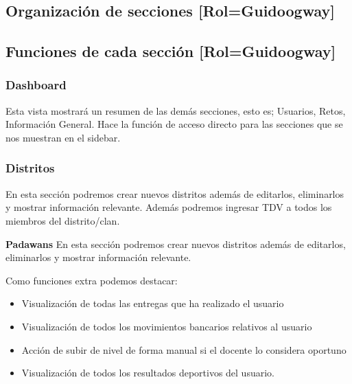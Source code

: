 \subsection{Organización de secciones [Rol=Guidoogway]}

\newpage


\subsection{Funciones de cada sección [Rol=Guidoogway]}
\subsubsection{Dashboard}
Esta vista mostrará un resumen de las demás secciones, esto es; Usuarios, Retos, Información General. Hace la función de acceso directo para las secciones que se nos muestran en el sidebar.

\subsubsection{Distritos}
En esta sección podremos crear nuevos distritos además de editarlos, eliminarlos y mostrar información relevante. Además podremos ingresar TDV a todos los miembros del distrito/clan.

\textbf{Padawans}
En esta sección podremos crear nuevos distritos además de editarlos, eliminarlos y mostrar información relevante.

Como funciones extra podemos destacar:
\begin{itemize}
	\item Visualización de todas las entregas que ha realizado el usuario
	\item Visualización de todos los movimientos bancarios relativos al usuario
	\item Acción de subir de nivel de forma manual si el docente lo considera oportuno
	\item Visualización de todos los resultados deportivos del usuario.
\end{itemize}

